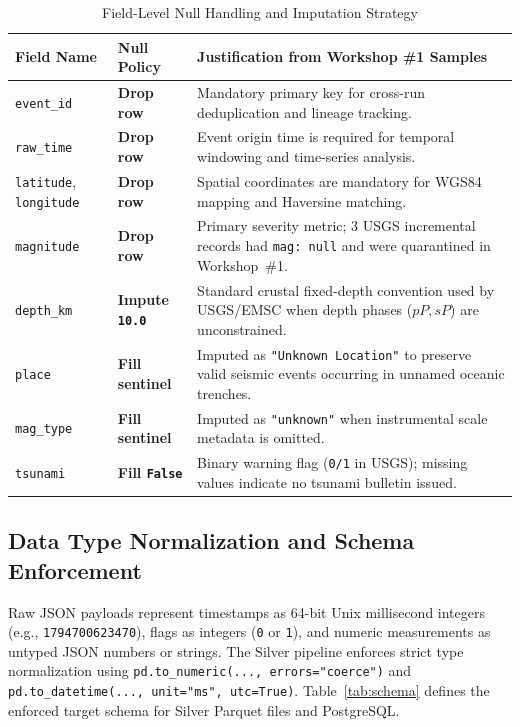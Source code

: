 \begin{table}[!t]
\caption{Field-Level Null Handling and Imputation Strategy}
\label{tab:null_strategy}
\centering
\renewcommand{\arraystretch}{1.12}
\begin{tabularx}{\columnwidth}{p{2.1cm} p{1.6cm} X}
\toprule
\textbf{Field Name} & \textbf{Null Policy} & \textbf{Justification from Workshop \#1 Samples} \\
\midrule
\texttt{event\_id} & \textbf{Drop row} & Mandatory primary key for cross-run deduplication and lineage tracking. \\
\texttt{raw\_time} & \textbf{Drop row} & Event origin time is required for temporal windowing and time-series analysis. \\
\texttt{latitude}, \texttt{longitude} & \textbf{Drop row} & Spatial coordinates are mandatory for WGS84 mapping and Haversine matching. \\
\texttt{magnitude} & \textbf{Drop row} & Primary severity metric; 3 USGS incremental records had \texttt{mag: null} and were quarantined in Workshop~\#1. \\
\texttt{depth\_km} & \textbf{Impute \texttt{10.0}} & Standard crustal fixed-depth convention used by USGS/EMSC when depth phases ($pP, sP$) are unconstrained. \\
\texttt{place} & \textbf{Fill sentinel} & Imputed as \texttt{"Unknown Location"} to preserve valid seismic events occurring in unnamed oceanic trenches. \\
\texttt{mag\_type} & \textbf{Fill sentinel} & Imputed as \texttt{"unknown"} when instrumental scale metadata is omitted. \\
\texttt{tsunami} & \textbf{Fill \texttt{False}} & Binary warning flag (\texttt{0/1} in USGS); missing values indicate no tsunami bulletin issued. \\
\bottomrule
\end{tabularx}
\end{table}

\subsection{Data Type Normalization and Schema Enforcement}
Raw JSON payloads represent timestamps as 64-bit Unix millisecond integers (e.g., \texttt{1794700623470}), flags as integers (\texttt{0} or \texttt{1}), and numeric measurements as untyped JSON numbers or strings. The Silver pipeline enforces strict type normalization using \texttt{pd.to\_numeric(..., errors="coerce")} and \texttt{pd.to\_datetime(..., unit="ms", utc=True)}. Table~\ref{tab:schema} defines the enforced target schema for Silver Parquet files and PostgreSQL.

